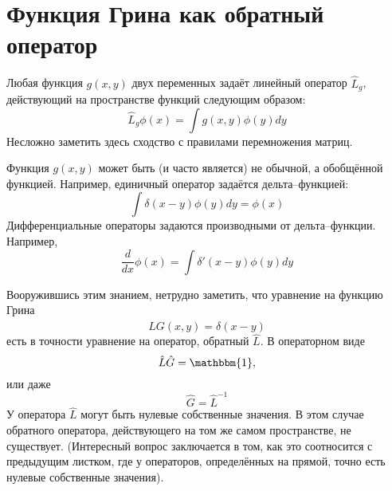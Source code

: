 \documentclass{article}
\begin{document}
\section{Функция Грина как обратный оператор}
Любая функция $g(x,y)$ 
двух переменных задаёт линейный оператор $\hat{L}_g$, действующий 
на пространстве функций следующим образом:
\begin{equation}
    \hat{L}_g\phi(x) = \int  g(x,y) \phi(y) dy
\end{equation}
Несложно заметить здесь сходство с правилами перемножения матриц.

Функция $g(x,y)$ может быть (и часто является) не обычной, а обобщённой функцией. Например,
единичный оператор задаётся дельта--функцией:
\begin{equation}
    \int \delta(x-y) \phi(y) dy = \phi(x)
\end{equation}
Дифференциальные операторы задаются производными от дельта--функции. Например,
\begin{equation}
    \frac{d}{dx} \phi(x) = \int \delta'(x-y) \phi(y) dy
\end{equation}

Вооружившись этим знанием, нетрудно заметить, что уравнение на функцию Грина
\begin{equation}
    \hat{L}G(x,y) = \delta(x-y)
\end{equation}
есть в точности уравнение на оператор, обратный $\hat{L}$. В операторном виде
\begin{equation}
    \hat{L} \hat{G} = \mathbbm{1},
\end{equation}
или даже 
\begin{equation}
    \hat{G} = \hat{L}^{-1}
\end{equation}
У оператора $\hat{L}$ могут быть нулевые собственные 
значения. В этом случае обратного оператора, действующего на том же самом пространстве,
не существует. (Интересный вопрос заключается в том, как это соотносится с предыдущим листком,
где у операторов, определённых на прямой, точно есть нулевые собственные значения).

\end{document}
